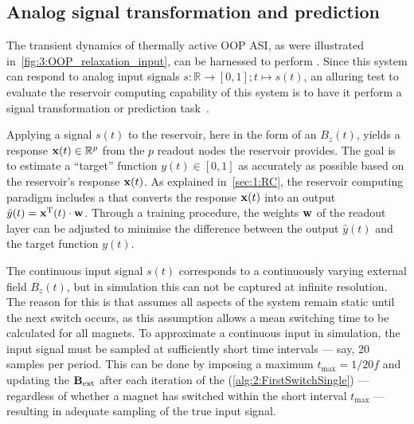 \subsection{Analog signal transformation and prediction}
The transient dynamics of thermally active OOP ASI, as were illustrated in~\cref{fig:3:OOP_relaxation_input}, can be harnessed to perform .
Since this system can respond to analog input signals $s: \mathbb{R} \rightarrow [0, 1]; t \mapsto s(t)$, an alluring test to evaluate the reservoir computing capability of this system is to have it perform a signal transformation or prediction task~\cite{gartside2022reconfigurable,NeuromorphicFewShot,RC_NNN,TaskAdaptivePRC}. \par %
Applying a signal $s(t)$ to the reservoir, here in the form of an  $B_z(t)$, yields a response $\boldsymbol{\mathbf{x}}(t) \in \mathbb{R}^p$ from the $p$ readout nodes the reservoir provides.
The goal is to estimate a ``target'' function $y(t) \in [0,1]$ as accurately as possible based on the reservoir's response $\boldsymbol{\mathbf{x}}(t)$.
As explained in~\cref{sec:1:RC}, the reservoir computing paradigm includes a  that converts the response $\boldsymbol{\mathbf{x}}(t)$ into an output $\hat{y}(t) = \boldsymbol{\mathbf{x}}^\mathrm{T}(t) \cdot \boldsymbol{\mathbf{w}}$.
Through a training procedure, the weights $\boldsymbol{\mathbf{w}}$ of the readout layer can be adjusted to minimise the difference between the output $\hat{y}(t)$ and the target function $y(t)$. \par
The continuous input signal $s(t)$ corresponds to a continuously varying external field $B_z(t)$, but in simulation this can not be captured at infinite resolution.
The reason for this is that \hotspice assumes all aspects of the system remain static until the next switch occurs, as this assumption allows a mean switching time to be calculated for all magnets.
To approximate a continuous input in simulation, the input signal must be sampled at sufficiently short time intervals --- say, 20 samples per period.
This can be done by imposing a maximum  $t_\mathrm{max} = 1/20f$ and updating the  $\boldsymbol{\mathbf{B}}_\mathrm{ext}$ after each iteration of the  (\cref{alg:2:FirstSwitchSingle}) --- regardless of whether a magnet has switched within the short interval $t_\mathrm{max}$ --- resulting in adequate sampling of the true input signal. \\\par

